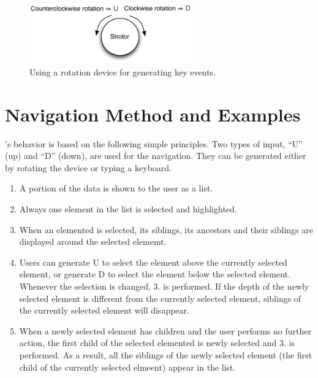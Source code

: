 \documentclass{article}
\begin{document}

\begin{figure}[H]
\centerline{\includegraphics[width=70mm,bb=0 0 306 110]{figures/rotation.pdf}}
\caption{Using a rotation device for generating key events.}
\label{rotation}
\end{figure}

\section*{Navigation Method and Examples}

{\ST}'s behavior is based on the following simple principles.
Two types of input, ``U'' (up) and ``D'' (down), are used for the navigation.
They can be generated either by rotating the {\ST} device or typing a keyboard.

\begin{enumerate}
\item A portion of the data is shown to the user as a list.

\item Always one element in the list is selected and highlighted.


\item When an elemented is selected, its siblings, its ancestors and their siblings are displayed
around the selected elememt.

\item Users can generate U to select the element above the currently selected element,
or generate D to select the element below the selected element.
Whenever the selection is changed, 3. is performed.
If the depth of the newly selected element is different from the currently
selected element, siblings of the currently selected element will disappear.

\item When a newly selected element has children and the user performs no further action,
the first child of the selected elemented is newly selected and 3. is performed.
As a result, all the siblings of the newly selected element
(the first child of the currently selected elmeent) appear in the list.

\end{enumerate}
\end{document}

